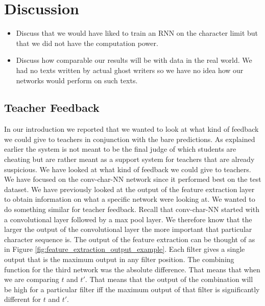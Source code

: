 \section{Discussion} \label{sec:discussion} 

\begin{itemize}

    \item

        Discuss that we would have liked to train an RNN on the character limit
        but that we did not have the computation power.

    \item

        Discuss how comparable our results will be with data in the real world.
        We had no texts written by actual ghost writers so we have no idea how
        our networks would perform on such texts.

\end{itemize}


\subsection{Teacher Feedback}

In our introduction we reported that we wanted to look at what kind of feedback
we could give to teachers in conjunction with the bare predictions. As explained
earlier the system is not meant to be the final judge of which students are
cheating but are rather meant as a support system for teachers that are
already suspicious. We have looked at what kind of feedback we could give to
teachers. We have focused on the \gls{conv-char-NN} network since it performed
best on the test dataset. We have previously looked at the output of the
feature extraction layer to obtain information on what a specific network
were looking at. We wanted to do something similar for teacher feedback.
Recall that \gls{conv-char-NN} started with a convolutional layer followed
by a max pool layer. We therefore know that the larger the output of the
convolutional layer the more important that particular character sequence
is. The output of the feature extraction can be thought of as in Figure
\ref{fig:feature_extraction_output_example}. Each filter gives a single
output that is the maximum output in any filter position. The combining function
for the third network was the absolute difference. That means that when we
are comparing $t$ and $t'$. That means that the output of the combination
will be high for a particular filter iff the maximum output of that filter is
significantly different for $t$ and $t'$.

